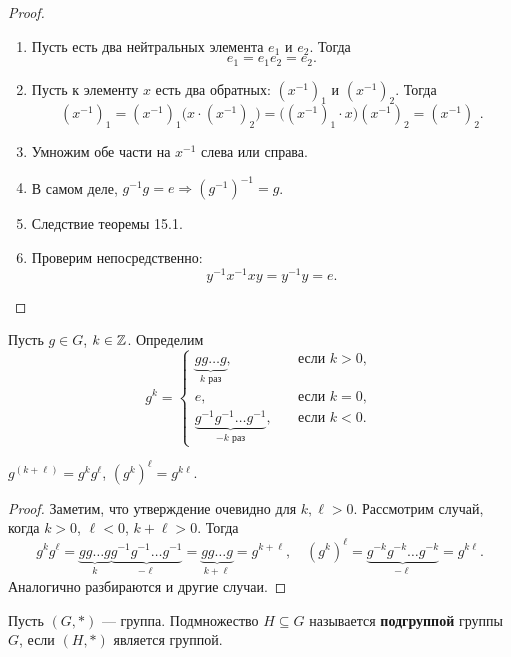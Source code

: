 \begin{proof}
    \begin{enumerate}[nolistsep]
        \item Пусть есть два нейтральных элемента $e_1$ и $e_2$. Тогда
            $$
            e_1 = e_1e_2 = e_2.
            $$
        \item Пусть к элементу $x$ есть два обратных: $(x^{-1})_1$ и $(x^{-1})_2$. Тогда
            $$
            (x^{-1})_1 = (x^{-1})_1\big(x\cdot(x^{-1})_2\big) = \big((x^{-1})_1\cdot x\big)(x^{-1})_2 = (x^{-1})_2.
            $$
        \item Умножим обе части на $x^{-1}$ слева или справа.
        \item В самом деле, $g^{-1}g = e \Rightarrow (g^{-1})^{-1} = g$.
        \item Следствие теоремы 15.1.
        \item Проверим непосредственно:
            $$
            y^{-1}x^{-1}xy = y^{-1}y = e.
            $$
    \end{enumerate}
\end{proof}

\begin{definition}
    Пусть $g \in G$, $k \in \mathbb{Z}$. Определим
    $$
    g^k = 
    \begin{cases}
        \underbrace{gg\ldots g}_{\text{$k$ раз}},\quad&\text{если $k > 0$},\\
        e,\quad&\text{если $k = 0$},\\
        \underbrace{g^{-1}g^{-1}\ldots g^{-1}}_{\text{$-k$ раз}},\quad&\text{если $k < 0$}.
    \end{cases}
    $$
\end{definition}

\begin{lemma}
    $g^{(k + \ell)} = g^kg^\ell$, $(g^k)^\ell = g^{k\ell}$.
\end{lemma}

\begin{proof}
    Заметим, что утверждение очевидно для $k, \ell > 0$. Рассмотрим случай, когда $k > 0$, $\ell < 0$, $k + \ell > 0$. Тогда
    $$
    g^kg^\ell = \underbrace{gg\ldots g}_{k}\underbrace{g^{-1}g^{-1}\ldots g^{-1}}_{-\ell} = \underbrace{gg\ldots g}_{k + \ell} = g^{k + \ell},\quad (g^k)^\ell = \underbrace{g^{-k}g^{-k}\ldots g^{-k}}_{-\ell} = g^{k\ell}.
    $$
    Аналогично разбираются и другие случаи.
\end{proof}

\begin{definition}
    Пусть $(G, \ast)$ --- группа. Подмножество $H \subseteq G$ называется \textbf{подгруппой} группы $G$, если $(H, \ast)$ является группой.
\end{definition}

